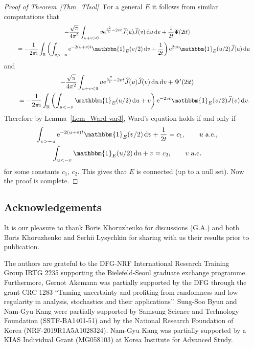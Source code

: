 \documentclass[pdftex]{sigma}
\numberwithin{equation}{section}
\newcommand{\R}{{\mathbb R}}
\newcommand{\1}{\chi}
\def\wh{\widehat}
\begin{document}
\begin{proof}[Proof of Theorem~\ref{Thm_TIsol}]
	For a general $E$ it follows from similar computations that
	\begin{gather*}
 -\frac{\sqrt{\pi}}{4\pi^2} \int_{ u+v>0 } v {\rm e}^{ \frac{v^2}{4}-2vt } \wh{J}(u) \wh{J}(v) \,{\rm d}u\,{\rm d}v+\frac{{\rm i}}{2t} \Psi(2{\rm i}t)
	\\
\qquad{} = - \frac{1}{2\pi {\rm i}} \int_\R \left( \int_{ v>-u } {\rm e}^{-2(u+v)t } \mathbbm{1}_{E}(v/2) \,{\rm d}v + \frac{1 }{ 2t } \right) {\rm e}^{2ut} \mathbbm{1}_{E}(u/2) \wh{J}(u)\,{\rm d}u
	\end{gather*}
	and
		\begin{gather*}
 -\frac{\sqrt{\pi}}{4\pi^2} \int_{ u+v<0 } u {\rm e}^{ \frac{u^2}{4}-2vt } \wh{J}(u) \wh{J}(v) \,{\rm d}u\,{\rm d}v
	+ \Psi'(2{\rm i}t)
		\\
	\qquad{} =-\frac{1}{2\pi {\rm i}}\int_\R \left( \int_{u<-v} \mathbbm{1}_{E}(u/2)\,{\rm d}u + v \right) {\rm e}^{-2vt} \mathbbm{1}_{E}(v/2) \wh{J}(v) \,{\rm d}v.
	\end{gather*}
	Therefore by Lemma~\ref{Lem_Ward var3}, Ward's equation holds if and only if
	\begin{gather*}
	 \int_{ v>-u } {\rm e}^{-2(u+v)t } \mathbbm{1}_{E}(v/2) \,{\rm d}v + \frac{1 }{ 2t }=c_1, \qquad u \textrm{ a.e.},
	 \\
\int_{u<-v} \mathbbm{1}_{E}(u/2)\,{\rm d}u + v =c_2, \qquad v\textrm{ a.e.}
	\end{gather*}
	for some constants $c_1$, $c_2$. This gives that $E$ is connected (up to a null set). Now the proof is complete.
\end{proof}

\subsection*{Acknowledgements}
It is our pleasure to thank Boris Khoruzhenko for discussions (G.A.) and both Boris Khoruzhenko and Serhii Lysychkin for sharing with us their results \cite{BL,BL2,Lysychkin} prior to publication.

The authors are grateful to the DFG-NRF International Research Training Group IRTG 2235 supporting the Bielefeld-Seoul graduate exchange programme.
Furthermore, Gernot Akemann was partially supported
by the DFG through the grant CRC 1283 ``Taming uncertainty and profiting from randomness and low regularity in analysis, stochastics and their applications''.
Sung-Soo Byun and Nam-Gyu Kang were partially supported by Samsung Science and Technology Foundation (SSTF-BA1401-51) and by the National Research Foundation of Korea (NRF-2019R1A5A1028324).
Nam-Gyu Kang was partially supported by a KIAS Individual Grant (MG058103) at Korea Institute for Advanced Study.
\end{document}
